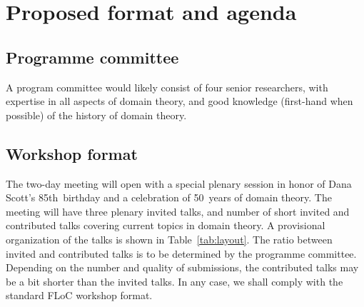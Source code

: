 \documentclass{article}
\begin{document}
\section{Proposed format and agenda}

\subsection{Programme committee}

A program committee would likely consist of four senior researchers, with expertise in all
aspects of domain theory, and good knowledge (first-hand when possible) of the history of
domain theory.


\subsection{Workshop format}

The two-day meeting will open with a special plenary session in honor of Dana Scott's
85th~birthday and a celebration of 50~years of domain theory. The meeting will have three
plenary invited talks, and number of short invited and contributed talks covering current
topics in domain theory. A provisional organization of the talks is shown in
Table~\ref{tab:layout}. The ratio between invited and contributed talks is to be
determined by the programme committee. Depending on the number and quality of submissions,
the contributed talks may be a bit shorter than the invited talks. In any case, we shall
comply with the standard FLoC workshop format.

\end{document}
